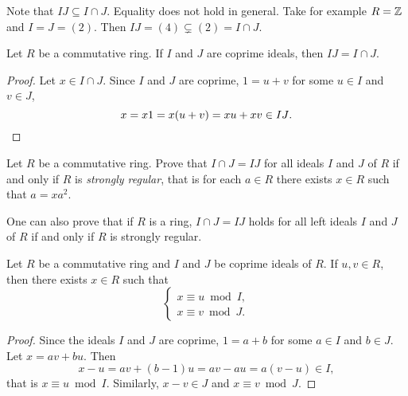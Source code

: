Note that $IJ\subseteq I\cap J$. Equality does not hold in general. Take
for example $R=\mathbb{Z}$ and $I=J=(2)$. Then $IJ=(4)\subsetneq (2)=I\cap J$. 

\begin{proposition}
Let $R$ be a commutative ring. If $I$ and $J$ are coprime ideals, then $IJ=I\cap J$. 	
\end{proposition}

\begin{proof}
Let $x\in I\cap J$. Since $I$ and $J$ are coprime, 
$1=u+v$ for some $u\in I$ and $v\in J$, 
\[ 
x=x1=x(u+v)=xu+xv\in IJ\qedhere.
\]
\end{proof}

\begin{bonus}
\label{xca:strongly_regular}
    Let $R$ be a commutative ring. 
    Prove that $I\cap J=IJ$ 
    for all ideals $I$ and $J$ of $R$
    if and only if $R$ is \emph{strongly regular}, 
    that is  
    for each $a\in R$ there 
    exists $x\in R$ such that $a=xa^2$. 
\end{bonus}

One can also prove that if $R$ is a ring,
$I\cap J=IJ$ holds 
for all left ideals $I$ and $J$ of $R$ 
if and only if $R$ is strongly regular. 


\begin{theorem}
Let $R$ be a commutative ring and $I$ and $J$ be coprime ideals of $R$. 
If $u,v\in R$, then 
there exists $x\in R$ such that 
\[
\begin{cases}	
x\equiv u\bmod I,\\
x\equiv v\bmod J.
\end{cases}
\]
\end{theorem}

\begin{proof}
Since the ideals $I$ and $J$ are coprime, $1=a+b$ for some $a\in I$ and $b\in J$. 
Let $x=av+bu$. Then
\[
x-u=av+(b-1)u=av-au=a(v-u)\in I,
\]
that is $x\equiv u\bmod I$. Similarly, $x-v\in J$ and $x\equiv v\bmod J$.  	
\end{proof}


